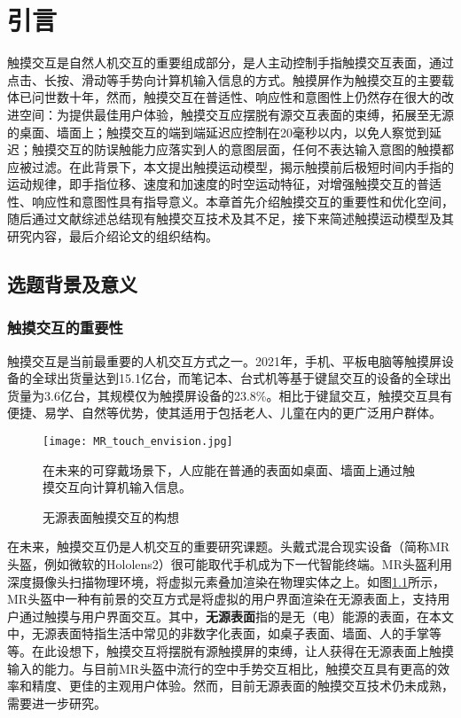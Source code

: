 
\chapter{引言}

触摸交互是自然人机交互的重要组成部分，是人主动控制手指触摸交互表面，通过点击、长按、滑动等手势向计算机输入信息的方式。触摸屏作为触摸交互的主要载体已问世数十年，然而，触摸交互在普适性、响应性和意图性上仍然存在很大的改进空间：为提供最佳用户体验，触摸交互应摆脱有源交互表面的束缚，拓展至无源的桌面、墙面上；触摸交互的端到端延迟应控制在20毫秒以内，以免人察觉到延迟；触摸交互的防误触能力应落实到人的意图层面，任何不表达输入意图的触摸都应被过滤。在此背景下，本文提出触摸运动模型，揭示触摸前后极短时间内手指的运动规律，即手指位移、速度和加速度的时空运动特征，对增强触摸交互的普适性、响应性和意图性具有指导意义。本章首先介绍触摸交互的重要性和优化空间，随后通过文献综述总结现有触摸交互技术及其不足，接下来简述触摸运动模型及其研究内容，最后介绍论文的组织结构。

\section{选题背景及意义}

\subsection{触摸交互的重要性}

触摸交互是当前最重要的人机交互方式之一。2021年，手机、平板电脑等触摸屏设备的全球出货量达到15.1亿台，而笔记本、台式机等基于键鼠交互的设备的全球出货量为3.6亿台\cite{alsop2020shipment}，其规模仅为触摸屏设备的23.8\%。相比于键鼠交互，触摸交互具有便捷、易学、自然等优势，使其适用于包括老人、儿童在内的更广泛用户群体。

\begin{figure}
	\centering
	\texttt{[image: MR\_touch\_envision.jpg]}
	\caption*{在未来的可穿戴场景下，人应能在普通的表面如桌面、墙面上通过触摸交互向计算机输入信息。}
	\caption{无源表面触摸交互的构想}
	\label{fig:MR_touch_envision}
\end{figure}

在未来，触摸交互仍是人机交互的重要研究课题。头戴式混合现实设备（简称MR头盔，例如微软的Hololens2\cite{hololens2}）很可能取代手机成为下一代智能终端。MR头盔利用深度摄像头扫描物理环境，将虚拟元素叠加渲染在物理实体之上。如图\ref{fig:MR_touch_envision}所示，MR头盔中一种有前景的交互方式是将虚拟的用户界面渲染在无源表面上，支持用户通过触摸与用户界面交互\cite{gu2019accurate}。其中，\textbf{无源表面}指的是无（电）能源的表面，在本文中，无源表面特指生活中常见的非数字化表面，如桌子表面、墙面、人的手掌等等。在此设想下，触摸交互将摆脱有源触摸屏的束缚，让人获得在无源表面上触摸输入的能力。与目前MR头盔中流行的空中手势交互相比，触摸交互具有更高的效率和精度、更佳的主观用户体验\cite{jakobsen2015should}。然而，目前无源表面的触摸交互技术仍未成熟，需要进一步研究。

